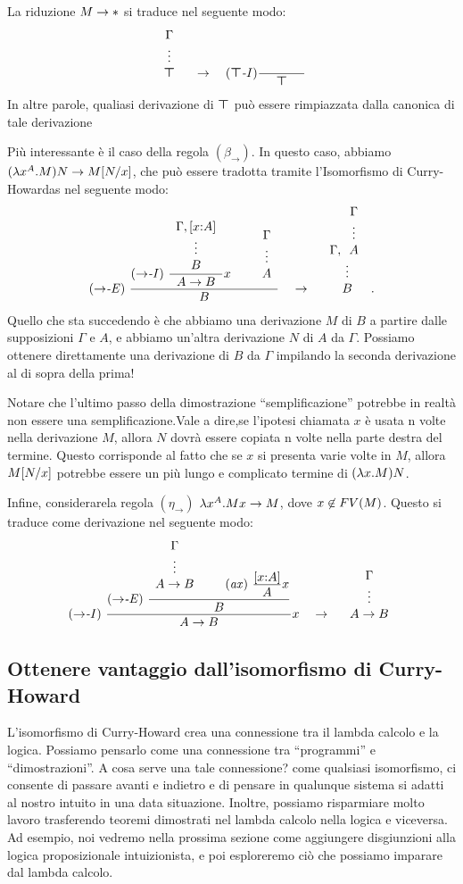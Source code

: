 \documentclass{article}
\begin{document}
La riduzione $M\to{*}$ si traduce nel seguente modo:
\[
\ideriv{\Gamma}{\ctrue} \ssep\to\ssep \trule{$\ctrue$-I}\deriv{\hspace{.5in}}{\ctrue}
\]
In altre parole, qualiasi derivazione di $\textrm{\rm\boldmath $\top$}$ pu\`o essere rimpiazzata dalla canonica di tale derivazione

Pi\`u interessante \`e il caso della regola $(\beta_{\to})$. In questo caso, abbiamo
$(\lambda x^{A}.M)N \to M[N/x]$, che pu\`o essere tradotta tramite
  l'Isomorfismo di Curry-Howardas nel seguente modo:
\[
\trule{$\to$-E}\ \deriv{\trule{$\to$-I}\ 
  \deriv{\ideriv{\Gamma,[\typ{x}{A}]}{B}}{A\to B} x
  \sep\ideriv{\Gamma}{A}}{B}
\ssep\to \ssep 
\ideriv{\Gamma,\ideriv{\Gamma}{A}}{B}.
\]
Quello che sta succedendo \`e che abbiamo una derivazione $M$ di $B$ a partire
dalle supposizioni $\Gamma$ e $A$, e abbiamo un'altra derivazione $N$ di
$A$ da $\Gamma$. Possiamo ottenere direttamente una derivazione di $B$ da
$\Gamma$ impilando la seconda derivazione al di sopra della prima!

Notare che l'ultimo passo della dimostrazione ``semplificazione''  potrebbe in realt\`a 
non essere una semplificazione.Vale a dire,se l'ipotesi chiamata $x$ \`e usata
n volte nella derivazione $M$, allora $N$ dovr\`a essere copiata n volte
nella parte destra del termine. Questo corrisponde al fatto che se
$x$ si presenta varie volte in $M$, allora $M[N/x]$ potrebbe essere
un pi\`u lungo e complicato termine di $(\lambda x.M)N$.

Infine, considerarela regola $(\eta_{\to})$  $\lambda x^{A}.Mx \to M$,
dove $x\not\in FV(M)$. Questo si traduce come derivazione nel seguente modo:
\[
\trule{$\to$-I}\ \deriv{\trule{$\to$-E}\ \deriv{\ideriv{\Gamma}{A\to
      B}\sep\trule{ax}\ \deriv{[\typ{x}{A}]}{A} x}{B}}{A\to B} x
\ssep\to\ssep \ideriv{\Gamma}{A\to B}
\]

\subsection{Ottenere vantaggio dall'isomorfismo di Curry-Howard}

L'isomorfismo di Curry-Howard crea una connessione tra il lambda
calcolo e la logica. Possiamo pensarlo come una connessione tra
``programmi'' e ``dimostrazioni''. A cosa serve una tale connessione? come qualsiasi
isomorfismo,  ci consente di passare avanti e indietro e di pensare in
qualunque sistema si adatti al nostro intuito in una data situazione.  Inoltre,
possiamo risparmiare molto lavoro trasferendo teoremi dimostrati
nel lambda calcolo nella logica e viceversa. Ad esempio, noi
vedremo nella prossima sezione come aggiungere disgiunzioni alla logica proposizionale
intuizionista, e poi esploreremo ci\`o che possiamo imparare
dal lambda calcolo.
\end{document}
